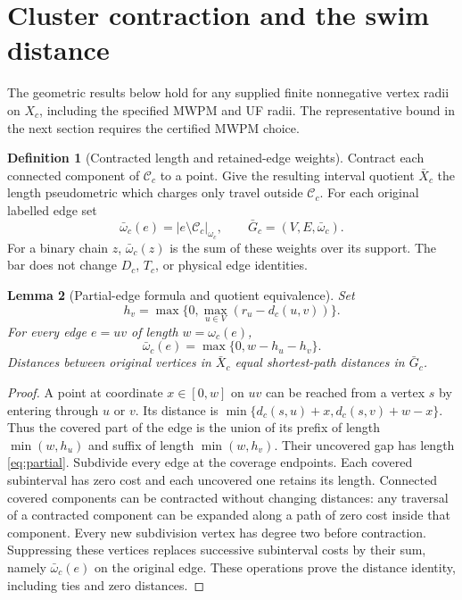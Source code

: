 \documentclass[11pt]{article}
\theoremstyle{definition}
\newtheorem{definition}{Definition}[section]
\theoremstyle{plain}
\newtheorem{lemma}[definition]{Lemma}
\theoremstyle{remark}
\begin{document}
\section{Cluster contraction and the swim distance}\label{sec:swim}
The geometric results below hold for any supplied finite nonnegative
vertex radii on $X_c$, including the specified MWPM and UF radii.
The representative bound in the next section requires the certified
MWPM choice.

\begin{definition}[Contracted length and retained-edge weights]
\label{def:contraction}
Contract each connected component of $\mathcal C_c$ to a point.
Give the resulting interval quotient $\bar X_c$ the length
pseudometric which charges only travel outside $\mathcal C_c$.
For each original labelled edge set
\[
 \bar\omega_c(e)=|e\setminus\mathcal C_c|_{\omega_c},
 \qquad \bar G_c=(V,E,\bar\omega_c).
\]
For a binary chain $z$, $\bar\omega_c(z)$ is the sum of these weights
over its support. The bar does not change $D_c$, $T_c$, or physical
edge identities.
\end{definition}

\begin{lemma}[Partial-edge formula and quotient equivalence]
\label{lem:metric}
Set
\[
 h_v=\max\{0,\max_{u\in V}(r_u-d_c(u,v))\}.
\]
For every edge $e=uv$ of length $w=\omega_c(e)$,
\begin{equation}
 \bar\omega_c(e)=\max\{0,w-h_u-h_v\}.
 \label{eq:partial}
\end{equation}
Distances between original vertices in $\bar X_c$ equal shortest-path
distances in $\bar G_c$.
\end{lemma}
\begin{proof}
A point at coordinate $x\in[0,w]$ on $uv$ can be reached from a vertex
$s$ by entering through $u$ or $v$. Its distance is
$\min\{d_c(s,u)+x,d_c(s,v)+w-x\}$.
Thus the covered part of the edge is the union of its prefix of
length $\min(w,h_u)$ and suffix of length $\min(w,h_v)$.
Their uncovered gap has length \eqref{eq:partial}.
Subdivide every edge at the coverage endpoints. Each covered
subinterval has zero cost and each uncovered one retains its length.
Connected covered components can be contracted without changing
distances: any traversal of a contracted component can be expanded
along a path of zero cost inside that component.
Every new subdivision vertex has degree two before contraction.
Suppressing these vertices replaces successive subinterval costs by
their sum, namely $\bar\omega_c(e)$ on the original edge.
These operations prove the distance identity, including ties and
zero distances.
\end{proof}
\end{document}
